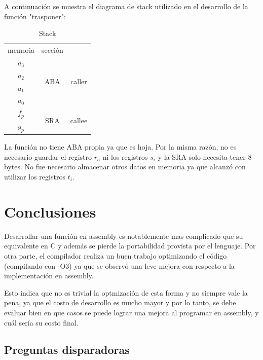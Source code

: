 \documentclass[11pt,a4paper]{article}
\begin{document}
A continuaci\'on se muestra el diagrama de stack utilizado en el desarrollo de
la funci\'on "trasponer":

\begin{table}[h!]
  \begin{center}
    \label{tab:table1}
    \begin{tabular}{|c|c|c}
        \cline{1-2}
        memoria & secci\'on & \\
        \cline{1-2}
        \cline{1-2}
        $a_3$ & \multirow{4}{*}{ABA} & \multirow{4}{*}{caller}\\
        \cline{1-1}
        $a_2$ & &\\
        \cline{1-1}
        $a_1$ & &\\
        \cline{1-1}
        $a_0$ & &\\
        \hline
        $f_p$ & \multirow{2}{*}{SRA} & \multirow{2}{*}{callee}\\
        \cline{1-1}
        $g_p$ & &\\
        \cline{1-2}
    \end{tabular}
    \caption{Stack}
  \end{center}
\end{table}

La funci\'on no tiene ABA propia ya que es hoja. Por la misma raz\'on, no
es necesario guardar el registro $r_a$ ni los registros $s_i$ y la SRA solo necesita tener 8 bytes.
No fue necesario almacenar otros datos en memoria ya que alcanzó con utilizar
los registros $t_i$.

\section{Conclusiones}

Desarrollar una funci\'on en assembly es notablemente mas complicado que su equivalente en C y
adem\'as se pierde la portabilidad provista por el lenguaje. Por otra parte, el compilador
realiza un buen trabajo optimizando el c\'odigo (compilando con -O3) ya que se observ\'o una
leve mejora con respecto a la implementaci\'on en assembly.

Esto indica que no es trivial la optmizaci\'on de esta forma y no siempre
vale la pena, ya que el costo de desarrollo es mucho mayor y por lo tanto, se
debe evaluar bien en que casos se puede lograr una mejora al programar en
assembly, y cu\'al ser\'ia su costo final.

\subsection{Preguntas disparadoras}
\end{document}
